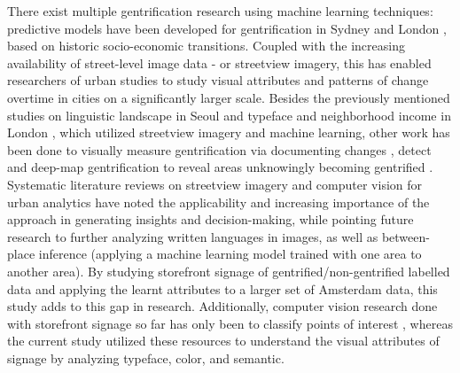 There exist multiple gentrification research using machine learning techniques: predictive models have been developed for gentrification in Sydney \cite{thackway2021} and London \cite{reades2019}, based on historic socio-economic transitions. Coupled with the increasing availability of street-level image data - or streetview imagery, this has enabled researchers of urban studies to study visual attributes and patterns of change overtime in cities on a significantly larger scale. Besides the previously mentioned studies on linguistic landscape in Seoul \cite{hong2020} and typeface and neighborhood income in London \cite{ma2019}, which utilized streetview imagery and machine learning, other work has been done to visually measure gentrification via documenting changes \cite{ravuri2022}, detect \cite{huang2022} and deep-map gentrification to reveal areas unknowingly becoming gentrified \cite{ilic2019}. Systematic literature reviews on streetview imagery and computer vision for urban analytics \cite{biljecki_2021, zhanga2023} have noted the applicability and increasing importance of the approach in generating insights and decision-making, while pointing future research to further analyzing written languages in images, as well as between-place inference (applying a machine learning model trained with one area to another area). By studying storefront signage of gentrified/non-gentrified labelled data and applying the learnt attributes to a larger set of Amsterdam data, this study adds to this gap in research. Additionally, computer vision research done with storefront signage so far has only been to classify points of interest \cite{noorian2020, bakaev2019}, whereas the current study utilized these resources to understand the visual attributes of signage by analyzing typeface, color, and semantic.

